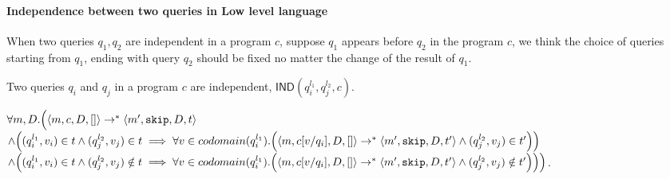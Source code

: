 \documentclass[a4paper,11pt]{article}
\begin{document}
\paragraph{Independence between two queries in Low level language}
%
When two queries $q_1,q_2$ are independent in a program $c$, suppose $q_1$ appears before $q_2$ in the program $c$, we think the choice of queries starting from $q_1$, ending with query $q_2$ should be fixed no matter the change of the result of $q_1$.\\
%
\begin{defn}
Two queries $q_i$ and $q_j$ in a program $c$ are independent, $\mathsf{IND}(q^{l_1}_i, q^{l_2}_j, c)$.

$\forall m, D. 
\Big( 
\langle m, c, D, [] \rangle \rightarrow^{*} \langle m', \mathtt{skip}, D, t \rangle 
$\\
$\land 
\left((q^{l_1}_i, v_i) \in t \land (q^{l_2}_j, v_j) \in t  \implies \forall v \in codomain(q^{l_1}_i). 
\left( \config{m, c[v/q_i], D, []} \rightarrow^{*} \config{m', \eskip, D, t'} \land (q^{l_2}_j, v_j) \in t'
\right)
\right)$
\\
$
\land 
\left( (q^{l_1}_i, v_i) \in t \land (q^{l_2}_j, v_j) \notin t  \implies \forall v\in codomain(q^{l_1}_i). 
\left( \config{m, c[v/q_i], D, []} \rightarrow^{*} \config{m', \eskip, D, t'} \land (q^{l_2}_j, v_j) \notin t'
\right)
\right)
\Big ) $.
\end{defn}
%
\end{document}
